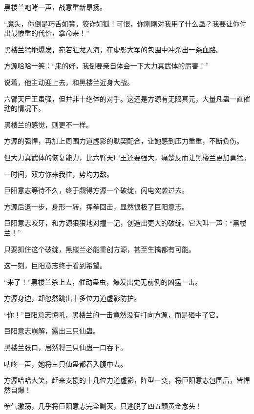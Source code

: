 \begin{this_body}
黑楼兰咆哮一声，战意重新昂扬。

“魔头，你倒是巧舌如簧，狡诈如狐！可恨，你刚刚对我用了什么蛊？我要让你付出最惨重的代价，拿命来！”

黑楼兰猛地爆发，宛若狂龙入海，在虚影大军的包围中冲杀出一条血路。

方源哈哈一笑：“来的好，我倒要亲自体会一下大力真武体的厉害！”

说着，他主动迎上去，和黑楼兰近身大战。

六臂天尸王虽强，但并非十绝体的对手。这还是方源有无限真元，大量凡蛊一直催动的情况下。

黑楼兰的感觉，则更不一样。

方源的强悍，再加上周围力道虚影的默契配合，让她感到压力重重，不断负伤。

但大力真武体的恢复能力，比六臂天尸王还要强大，痛楚反而让黑楼兰更加勇猛。

一时间，双方你来我往，势均力敌。

巨阳意志等待不久，终于觑得方源一个破绽，闪电突袭过去。

方源后退一步，身形一转，挥拳回击，显然恨极了巨阳意志。

巨阳意志咬牙，和方源狠狠地对撞一记，创造出更大的破绽。它大叫一声：“黑楼兰！”

只要抓住这个破绽，黑楼兰必能重创方源，甚至生擒都有可能。

这一刻，巨阳意志终于看到希望。

“来了！”黑楼兰杀上去，催动蛊虫，爆发出史无前例的凶猛一击。

方源身边，却忽然跳出十多位力道虚影防护。

“你！”巨阳意志惊吼，黑楼兰的一击竟然没有打向方源，而是砸中了它。

巨阳意志崩解，露出三只仙蛊。

黑楼兰张口，居然将三只仙蛊一口吞下。

咕咚一声，她将三只仙蛊都吞入腹中去。

方源哈哈大笑，赶来支援的十几位力道虚影，阵型一变，将巨阳意志包围后，皆悍然自爆！

拳气激荡，几乎将巨阳意志完全剿灭，只逃脱了四五颗黄金念头！

\end{this_body}


